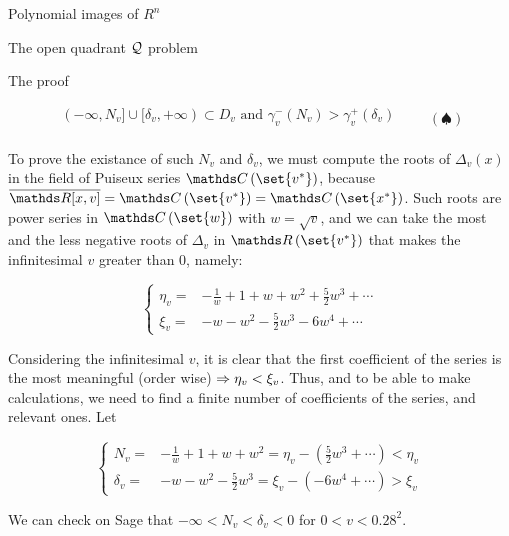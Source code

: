 \documentclass[11pt, a4paper, english, twoside, notitlepage]{report}
\begin{document}
\begin{chapter}{Polynomial images of $R^n$}
\begin{section}{The open quadrant $\mathcal{Q}$ problem}
\begin{subsection}{The proof}
\begin{Proof}
			\begin{equation*}
				\boxed{
					\begin{aligned}
					(-\infty, N_v] \cup [\delta_v, +\infty) \subset D_v \text{ and } \gamma_v^-(N_v) > \gamma_v^+(\delta_v)\\
					\end{aligned}
				}\qquad (\spadesuit)
			\end{equation*}
			
			To prove the existance of such $N_v$ and $\delta_v$, we must compute the roots of $\Delta_v(x)$ in the field of Puiseux series %
			$\C\left(\set{v^*}\right)$, because $\overline{\R[x, v]} = \C\left(\set{v^*}\right) = \C\left(\set{x^*}\right)$. %
			Such roots are power series in $\C\left(\set{w}\right)$ with $w = \sqrt{v}$, and we can take the most and the less negative roots of $\Delta_v$ in $\R\left(\set{v^*}\right)$ that makes the infinitesimal $v$ greater than 0, namely:
			
			\begin{equation*}\left\{
				\begin{split}
					\eta_v=&-\frac{1}{w}+1+w+w^2+\frac{5}{2}w^3+\cdots\\
					\xi_v=&-w-w^2-\frac{5}{2}w^3-6w^4+\cdots
				\end{split}\right.
			\end{equation*}
			
			Considering the infinitesimal $v$, it is clear that the first coefficient of the series is the most meaningful (order wise) $\Rightarrow \eta_v < \xi_v$. Thus, and to be able to make calculations, we need to find a finite number of coefficients of the series, and relevant ones. Let
			
			\begin{equation*}\left\{
				\begin{split}
					N_v=&-\frac{1}{w}+1+w+w^2=\eta_v-(\frac{5}{2}w^3+\cdots)<\eta_v\\
					\delta_v=&-w-w^2-\frac{5}{2}w^3=\xi_v-(-6w^4+\cdots)>\xi_v
				\end{split}\right.
			\end{equation*}
			
			We can check on Sage that $-\infty<N_v<\delta_v<0$ for $0<v<0.28^2$.


		\end{Proof}
		
	\end{subsection}
	
\end{section}


\end{chapter}
\end{document}
